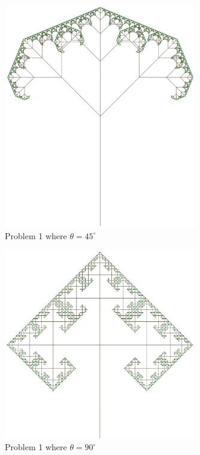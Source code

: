 \begin{figure}[H]
    \centering
    \includegraphics[width=0.75\textwidth]{figures/L-systems/prob1-45}
    \caption{Problem 1 where $\theta = 45^\circ$}\label{fig:prob1_45}
\end{figure}

\begin{figure}[H]
    \centering
    \includegraphics[width=0.75\textwidth]{figures/L-systems/prob1-90}
    \caption{Problem 1 where $\theta = 90^\circ$}\label{fig:prob1_90}
\end{figure}


